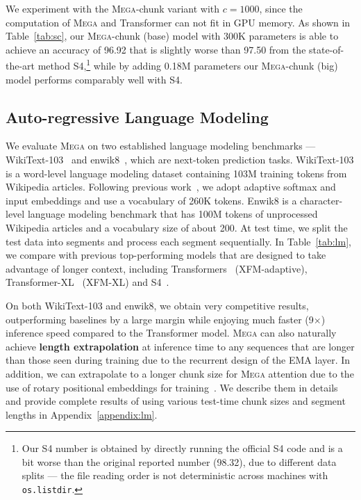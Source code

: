 We experiment with the \textsc{Mega}-chunk variant with $c=1000$, since the computation of \textsc{Mega} and Transformer can not fit in GPU memory. As shown in Table~\ref{tab:sc}, our \textsc{Mega}-chunk (base) model with 300K parameters is able to achieve an accuracy of 96.92 that is slightly worse than 97.50 from the state-of-the-art method S4,\footnote{
Our S4 number is obtained by directly running the official S4 code and is a bit worse than the original reported number (98.32), due to different data splits --- the file reading order is not deterministic across machines with \texttt{os.listdir}.
} while by adding 0.18M parameters our \textsc{Mega}-chunk (big) model performs comparably well with S4.

\subsection{Auto-regressive Language Modeling} We evaluate \textsc{Mega} on two established language modeling benchmarks --- WikiText-103~\citep{merity2017pointer} and enwik8~\citep{hutter2006human}, which are next-token prediction tasks. WikiText-103 is a word-level language modeling dataset containing 103M training tokens from Wikipedia articles. Following previous work~\citep{baevski2018adaptive,dai2019transformer}, we adopt adaptive softmax and input embeddings and use a vocabulary of 260K tokens. Enwik8 is a character-level language modeling benchmark that has 100M tokens of unprocessed Wikipedia articles and a vocabulary size of about 200. At test time, we split the test data into segments and process each segment sequentially. In Table~\ref{tab:lm}, we compare with previous top-performing models that are designed to take advantage of longer context, including Transformers~\citep{baevski2018adaptive,al2019character} (XFM-adaptive), Transformer-XL~\citep{dai2019transformer} (XFM-XL) and S4~\citep{gu2022efficiently}. 

On both WikiText-103 and enwik8, we obtain very competitive results, outperforming baselines by a large margin while enjoying much faster (9$\times$) inference speed compared to the Transformer model.
\textsc{Mega} can also naturally achieve \textbf{length extrapolation} at inference time to any sequences that are longer than those seen during training due to the recurrent design of the EMA layer. In addition, we can extrapolate to a longer chunk size for \textsc{Mega} attention due to the use of rotary positional embeddings for training~\citep{su2021roformer}. We describe them in details and provide complete results of using various test-time chunk sizes and segment lengths in Appendix~\ref{appendix:lm}.

